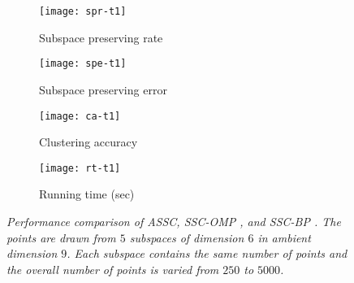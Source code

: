 \begin{figure*}[]
\begin{subfigure}[]{0.24\textwidth}
  \centering
    \texttt{[image: spr-t1]}\quad\caption{\footnotesize Subspace preserving rate}
    \end{subfigure}
\begin{subfigure}[]{0.24\textwidth}
  \centering
    \texttt{[image: spe-t1]}\quad\caption{\footnotesize  Subspace preserving error}
    \end{subfigure}
    \begin{subfigure}[]{.24\textwidth}
  \centering
    \texttt{[image: ca-t1]}\quad\caption{\footnotesize Clustering accuracy}
    \end{subfigure}
    \begin{subfigure}[]{.24\textwidth}
  \centering
    \texttt{[image: rt-t1]}\quad\caption{\footnotesize Running time (sec)}
\end{subfigure}
\caption{\it Performance comparison of ASSC, SSC-OMP \cite{dyer2013greedy,you2015sparse}, and SSC-BP \cite{elhamifar2009sparse,elhamifar2013sparse} {}. The  points are drawn from $5$ subspaces of dimension $6$ in ambient dimension $9$. Each subspace contains the same number of points and the overall number of points is varied from $250$ to $5000$.}
\vspace{-0.3cm}
\end{figure*}
